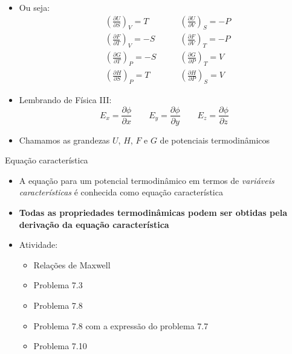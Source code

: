 \documentclass[t,%
brazilian,%
11pt,%
aspectratio=169,%
table%
]{beamer}
\begin{document}
\begin{frame}
    \begin{itemize}
        \item Ou seja:
            \begin{align*}
                    & \left(\frac{\partial U}{\partial S}\right)_V = T \qquad & \left(\frac{\partial U}{\partial V}\right)_S = -P \\
                    & \left(\frac{\partial F}{\partial T}\right)_V = -S \qquad & \left(\frac{\partial F}{\partial V}\right)_T = -P \\
                    & \left(\frac{\partial G}{\partial T}\right)_P = -S \qquad & \left(\frac{\partial G}{\partial P}\right)_T = V \\
                    & \left(\frac{\partial H}{\partial S}\right)_P = T \qquad & \left(\frac{\partial H}{\partial P}\right)_S = V
            \end{align*}
        \item Lembrando de Física III:
            \[
                E_x = \frac{\partial \phi}{\partial x} \qquad
                E_y = \frac{\partial \phi}{\partial y} \qquad
                E_z = \frac{\partial \phi}{\partial z} 
            \]
        \item Chamamos as grandezas \(U\), \(H\), \(F\) e \(G\) de potenciais termodinâmicos
    \end{itemize}
\end{frame}

\begin{frame}[c]{Equação característica}
    \begin{itemize}
        \item A equação para um potencial termodinâmico em termos de \textit{variáveis características} é conhecida
            como equação característica
        \item \textbf{Todas as propriedades termodinâmicas podem ser obtidas pela derivação da equação característica}
        \item Atividade: 
            \begin{itemize}
                \item Relações de Maxwell
                \item Problema 7.3
                \item Problema 7.8
                \item Problema 7.8 com a expressão do problema 7.7
                \item Problema 7.10

            \end{itemize}
    \end{itemize}
\end{frame}
\end{document}
